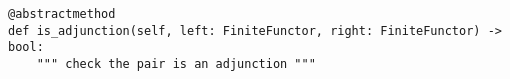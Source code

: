 \par\begin{minipage}{75ex}
\begin{verbatim}
@abstractmethod
def is_adjunction(self, left: FiniteFunctor, right: FiniteFunctor) -> bool:
    """ check the pair is an adjunction """
\end{verbatim}
\end{minipage}\par